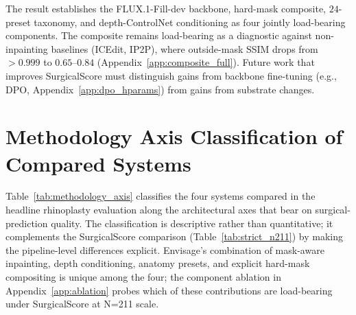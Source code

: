 \documentclass{article}
\newcommand{\method}{Envisage}
\begin{document}
\noindent The result establishes the FLUX.1-Fill-dev backbone, hard-mask
composite, $24$-preset taxonomy, and depth-ControlNet conditioning as four
jointly load-bearing components. The composite remains load-bearing as a
diagnostic against non-inpainting baselines (ICEdit, IP2P), where outside-mask
SSIM drops from $>0.999$ to $0.65$--$0.84$ (Appendix~\ref{app:composite_full}).
Future work that improves SurgicalScore must distinguish gains from backbone
fine-tuning (e.g., DPO, Appendix~\ref{app:dpo_hparams}) from gains from
substrate changes.

\section{Methodology Axis Classification of Compared Systems}
\label{app:methodology_axis}

Table~\ref{tab:methodology_axis} classifies the four systems compared in the
headline rhinoplasty evaluation along the architectural axes that bear on
surgical-prediction quality. The classification is descriptive rather than
quantitative; it complements the SurgicalScore comparison
(Table~\ref{tab:strict_n211}) by making the pipeline-level differences explicit.
\method{}'s combination of mask-aware inpainting, depth conditioning, anatomy
presets, and explicit hard-mask compositing is unique among the four; the
component ablation in Appendix~\ref{app:ablation} probes which of these
contributions are load-bearing under SurgicalScore at N=211 scale.
\end{document}
